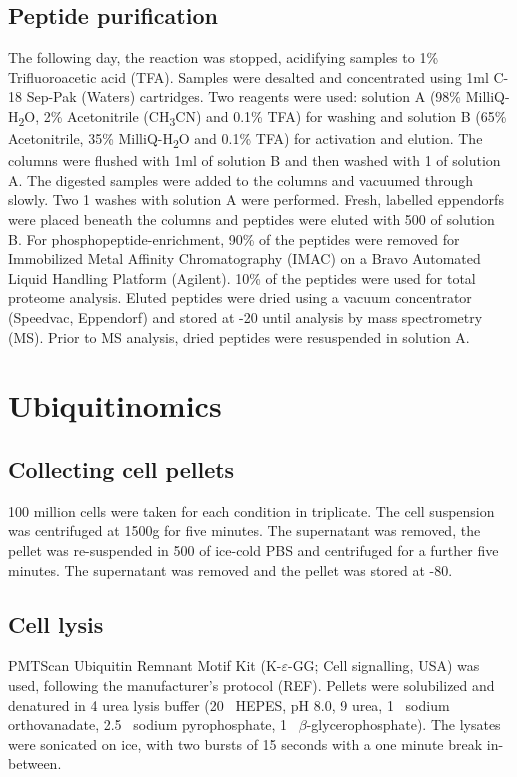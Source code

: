 \subsection{Peptide purification}
The following day, the reaction was stopped, acidifying samples to 1\% Trifluoroacetic acid (TFA).
Samples were desalted and concentrated using 1ml C-18 Sep-Pak (Waters) cartridges.
Two reagents were used: solution A (98\% MilliQ-H\textsubscript{2}O, 2\% Acetonitrile (CH\textsubscript{3}CN) and 0.1\% TFA) for washing and solution B (65\% Acetonitrile, 35\% MilliQ-H\textsubscript{2}O and 0.1\% TFA) for activation and elution.
The columns were flushed with 1ml of solution B and then washed with 1\ml{} of solution A.
The digested samples were added to the columns and vacuumed through slowly.
Two 1\ml{} washes with solution A were performed.
Fresh, labelled eppendorfs were placed beneath the columns and peptides were eluted with 500\ul{} of solution B.
For phosphopeptide-enrichment, 90\% of the peptides were removed for Immobilized Metal Affinity Chromatography (IMAC) on a Bravo Automated Liquid Handling Platform (Agilent).
10\% of the peptides were used for total proteome analysis.
Eluted peptides were dried using a vacuum concentrator (Speedvac, Eppendorf) and stored at -20\C{} until analysis by mass spectrometry (MS).
Prior to MS analysis, dried peptides were resuspended in solution A.


\section{Ubiquitinomics}
%
\subsection{Collecting cell pellets}
100 million cells were taken for each condition in triplicate.
The cell suspension was centrifuged at 1500g for five minutes.
The supernatant was removed, the pellet was re-suspended in 500\ul{} of ice-cold PBS and centrifuged for a further five minutes.
The supernatant was removed and the pellet was stored at -80\C{}.

\subsection{Cell lysis}
PMTScan Ubiquitin Remnant Motif Kit (K-$\varepsilon$-GG; Cell signalling, USA) was used, following the manufacturer's protocol (REF).
Pellets were solubilized and denatured in 4\ml{} urea lysis buffer (20\si{\milli\Molar} HEPES, pH 8.0, 9\si{\Molar} urea, 1\si{\milli\Molar} sodium orthovanadate, 2.5\si{\milli\Molar} sodium pyrophosphate, 1\si{\milli\Molar} $\beta$-glycerophosphate).
The lysates were sonicated on ice, with two bursts of 15 seconds with a one minute break in-between.

